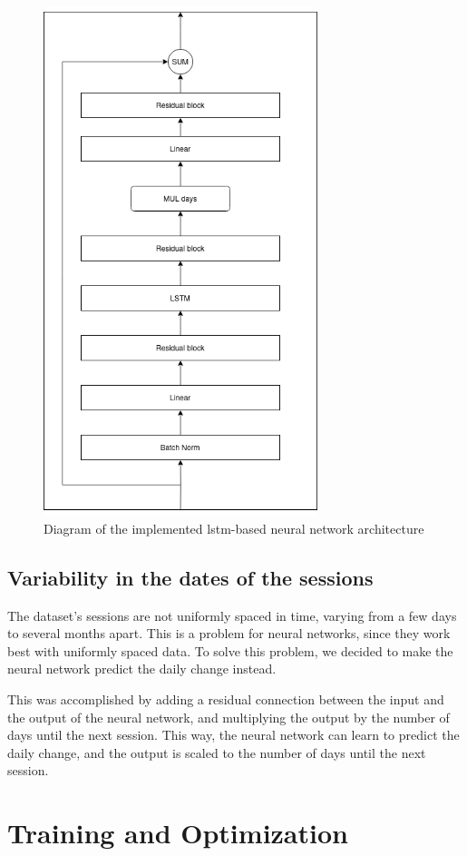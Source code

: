 \begin{figure}
    \centering
    \includegraphics[width=8cm]{files/nn_diagram}
    \caption{Diagram of the implemented \gls{lstm}-based neural network architecture}
\end{figure}

\subsection{Variability in the dates of the sessions}

The dataset's sessions are not uniformly spaced in time, varying from a few
days to several months apart. This is a problem for neural networks, since they
work best with uniformly spaced data. To solve this problem, we decided to make
the neural network predict the daily change instead.

This was accomplished by adding a residual connection between the input and the
output of the neural network, and multiplying the output by the number of days
until the next session. This way, the neural network can learn to predict the
daily change, and the output is scaled to the number of days until the next
session.
\section{Training and Optimization}

